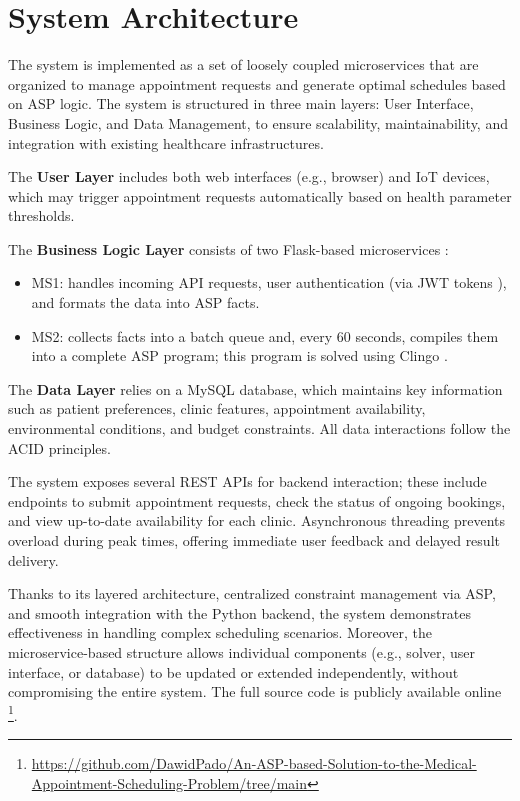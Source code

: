 \documentclass{tlp}
\begin{document}
\section{System Architecture}
\label{architecture}

The system is implemented as a set of loosely coupled microservices that are 
organized to manage appointment requests and generate optimal schedules based on ASP logic. The system is structured in three main layers: User Interface, Business Logic, and Data Management, to ensure scalability, maintainability, and integration with existing healthcare infrastructures.

The \textbf{User Layer} includes both web interfaces (e.g., browser) and IoT devices, which may trigger appointment requests automatically based on health parameter thresholds.

The \textbf{Business Logic Layer} consists of two Flask-based microservices \citep{newman2021building}:
\begin{itemize}
    \item MS1: handles incoming API requests, user authentication (via JWT tokens \citep{haekal2016token}), and formats the data into ASP facts.
    \item MS2: collects facts into a batch queue and, every 60 seconds, compiles them into a complete ASP program; this program is solved using Clingo \citep{gebser2014clingo}.
\end{itemize}

The \textbf{Data Layer} relies on a MySQL database, which maintains key information such as patient preferences, clinic features, appointment availability, environmental conditions, and budget constraints. All data interactions follow the ACID principles.

The system exposes several REST APIs for backend interaction; these include endpoints to submit appointment requests, check the status of ongoing bookings, and view up-to-date availability for each clinic. Asynchronous threading prevents overload during peak times, offering immediate user feedback and delayed result delivery.

Thanks to its layered architecture, centralized constraint management via ASP, and smooth integration with the Python backend, the system demonstrates effectiveness in handling complex scheduling scenarios. Moreover, the microservice-based structure allows individual components (e.g., solver, user interface, or database) to be updated or extended independently, without compromising the entire system.
The full source code is publicly available online \footnote{ \url{https://github.com/DawidPado/An-ASP-based-Solution-to-the-Medical-Appointment-Scheduling-Problem/tree/main}}.
\end{document}
